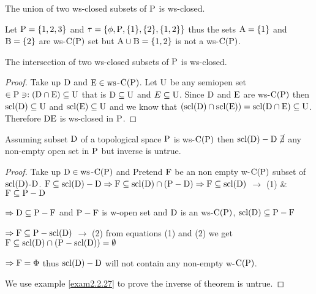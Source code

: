 \begin{thm}\label{thm2.2.23}
The union of two ws-closed subsets of $\mathrm{P}$ is ws-closed.
\end{thm}

\begin{exm}\label{exm2.2.24}
Let $\mathrm{P} = \{1, 2, 3\}$ and $\tau = \{\phi, \mathrm{P}, \{1\}, \{2\}, \{1, 2\}\}$ thus the sets $\mathrm{A}= \{1\}$ and $\mathrm{B}= \{2\}$ are ws-$\mathrm{C}(\mathrm{P})$ set but $\mathrm{A}\cup \mathrm{B} = \{1,2 \}$ is not a ws-$\mathrm{C}(\mathrm{P})$.
\end{exm}

\begin{thm}\label{thm2.2.25}
The intersection of two ws-closed subsets of $\mathrm{P}$ is ws-closed.
\end{thm}

\begin{proof}
Take up $\mathrm{D}$ and $\mathrm{E}\in \mathrm{ws}$-$\mathrm{C}(\mathrm{P})$. Let $\mathrm{U}$ be any semiopen set $\in\mathrm{P} \ni: (\mathrm{D}\cap \mathrm{E})\subseteq \mathrm{U}$ that is $\mathrm{D}\subseteq \mathrm{U}$ and $E\subseteq \mathrm{U}$. Since $\mathrm{D}$ and $\mathrm{E}$ are ws-$\mathrm{C}(\mathrm{P})$ then $\mathrm{scl}(\mathrm{D}) \subseteq  \mathrm{U}$ and $\mathrm{scl}(\mathrm{E})\subseteq \mathrm{U}$ and we know that $(\mathrm{scl}(\mathrm{D})\cap \mathrm{scl}(\mathrm{E})) = \mathrm{scl}(\mathrm{D}\cap \mathrm{E})\subseteq \mathrm{U}$. Therefore $\mathrm{D}\mathrm{E}$ is ws-closed in $\mathrm{P}$.
\end{proof}

\begin{thm}\label{thm2.2.26}
Assuming subset $\mathrm{D}$ of a topological space $\mathrm{P}$ is ws-$\mathrm{C}(\mathrm{P})$ then $\mathrm{scl}(\mathrm{D})-\mathrm{D}~\cancel{\exists}$ any non-empty open set in $\mathrm{P}$ but inverse is untrue.
\end{thm}

\begin{proof}
Take up $\mathrm{D}\in\mathrm{ws}$-$\mathrm{C}(\mathrm{P})$ and Pretend $\mathrm{F}$ be an non empty w-$\mathrm{C}(\mathrm{P})$ subset of $\mathrm{scl}(\mathrm{D})$-$\mathrm{D}$. $\mathrm{F}\subseteq \mathrm{scl}(\mathrm{D})-\mathrm{D}\Rightarrow\mathrm{F}\subseteq \mathrm{scl}(\mathrm{D})\cap(\mathrm{P}-\mathrm{D})\Rightarrow \mathrm{F}\subseteq \mathrm{scl}(\mathrm{D})$ $\to$ (1) \& $\mathrm{F}\subseteq\mathrm{P}-\mathrm{D}$

$\Rightarrow \mathrm{D}\subseteq \mathrm{P}-\mathrm{F}$ and $\mathrm{P}-\mathrm{F}$ is w-open set and $\mathrm{D}$ is an ws-$\mathrm{C}(\mathrm{P})$, $\mathrm{scl}(\mathrm{D})\subseteq \mathrm{P}-\mathrm{F}$

$\Rightarrow \mathrm{F}\subseteq \mathrm{P}-\mathrm{scl}(\mathrm{D})$ $\to$ (2) from equations (1) and (2) we get $\mathrm{F}\subseteq \mathrm{scl}(\mathrm{D})\cap(\mathrm{P}-\mathrm{scl}(\mathrm{D}))=\emptyset$

$\Rightarrow\mathrm{F} =\Phi$ thus $\mathrm{scl}(\mathrm{D})-\mathrm{D}$ will not contain any non-empty w-$\mathrm{C}(\mathrm{P})$.

We use example \ref{exam2.2.27} to prove the inverse of theorem is untrue.
\end{proof}

